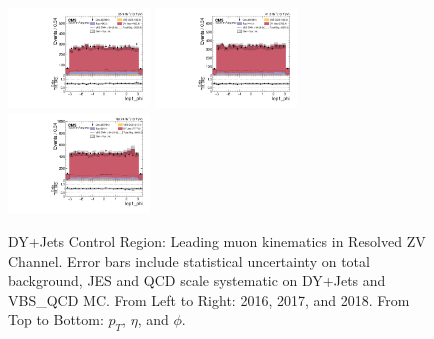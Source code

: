 \begin{figure}[!ht]
  \includegraphics[width=0.335\textwidth]{analysis_plots/2016_zjj/cr_vjets_m/lep1_phi.pdf} \hspace{-10pt}
  \includegraphics[width=0.335\textwidth]{analysis_plots/2017_zjj/cr_vjets_m/lep1_phi.pdf} \hspace{-10pt}
  \includegraphics[width=0.335\textwidth]{analysis_plots/2018_zjj/cr_vjets_m/lep1_phi.pdf} \hspace{-10pt} \\
  \caption[DY+Jets Control Region: Leading muon kinematics in Resolved ZV Channel]%
  {DY+Jets Control Region: Leading muon kinematics in Resolved ZV Channel.
    Error bars include statistical uncertainty on total background,
    JES and QCD scale systematic on DY+Jets and VBS\_QCD MC\@. From Left to Right: 2016,
    2017, and 2018. From Top to Bottom: \( p_T \), \( \eta \), and \( \phi \).}%
  \label{fig:zjj-cr-vjets-m-lep1-pt-eta-phi}
\end{figure}

